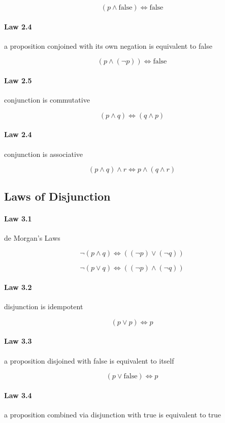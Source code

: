 \documentclass[twocolumn]{article}
\begin{document}
$$ (p  \wedge  \text{false})  \iff  \text{false} $$

\paragraph{Law 2.4} a proposition conjoined with its own negation is equivalent to false

$$ (p  \wedge  ( \neg p))  \iff  \text{false} $$

\paragraph{Law 2.5} conjunction is commutative

$$ (p  \wedge  q)  \iff  (q  \wedge  p) $$

\paragraph{Law 2.4} conjunction is associative

$$ (p  \wedge  q)  \wedge  r  \iff  p  \wedge  (q  \wedge  r) $$

\subsection{Laws of Disjunction}

\paragraph{Law 3.1} de Morgan’s Laws

$$ \neg (p  \wedge  q)  \iff  (( \neg p)  \vee  ( \neg q)) $$

$$ \neg (p  \vee  q)  \iff  (( \neg p)  \wedge  ( \neg q)) $$

\paragraph{Law 3.2} disjunction is idempotent

$$ (p  \vee  p)  \iff  p $$

\paragraph{Law 3.3} a proposition disjoined with false is equivalent to itself

$$ (p  \vee  \text{false})  \iff  p $$

\paragraph{Law 3.4} a proposition combined via disjunction with true is equivalent to true
\end{document}
